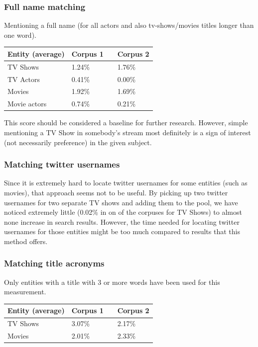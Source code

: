 \documentclass{article}
\begin{document}
\subsubsection{Full name matching}
Mentioning a full name (for all actors and also tv-shows/movies titles longer
than one word).

\begin{center}
  \begin{tabular}{ | p{4cm} | p{2cm} | p{1cm}| p{2cm} | } \hline
    Entity (average) & Corpus 1 & & Corpus 2 \\ \hline
    TV Shows & 1.24\% & & 1.76\% \\ \hline
    TV Actors & 0.41\% & & 0.00\% \\ \hline
    Movies & 1.92\% & & 1.69\% \\ \hline
    Movie actors & 0.74\% & & 0.21\% \\ \hline
  \end{tabular}
\end{center}

This score should be considered a baseline for further research. However, simple
mentioning a TV Show in somebody's stream most definitely is a sign of interest
(not necessarily preference) in the given subject.

\subsubsection{Matching twitter usernames}
Since it is extremely hard to locate twitter usernames for some entities (such
as movies), that approach seems not to be useful. By picking up two twitter
usernames for two separate TV shows and adding them to the pool, we have noticed
extremely little (0.02\% in on of the corpuses for TV Shows) to almost none increase in search results.
However, the time needed for locating twitter usernames for those entities might
be too much compared to results that this method offers.

\subsubsection{Matching title acronyms}
Only entities with a title with 3 or more words have been used for this
measurement.

\begin{center}
  \begin{tabular}{ | p{4cm} | p{2cm} | p{1cm}| p{2cm} | } \hline
    Entity (average) & Corpus 1 & & Corpus 2 \\ \hline
    TV Shows & 3.07\% & & 2.17\% \\ \hline
    Movies & 2.01\% & & 2.33\% \\ \hline
  \end{tabular}
\end{center}
\end{document}
